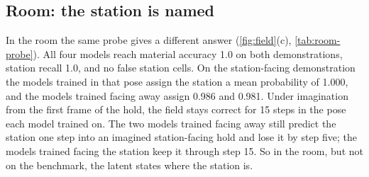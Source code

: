 \subsection{Room: the station is named}

In the room the same probe gives a different answer (\cref{fig:field}(c), \cref{tab:room-probe}).
All four models reach material accuracy 1.0 on both demonstrations, station recall 1.0, and no false station cells.
On the station-facing demonstration the models trained in that pose assign the station a mean probability of 1.000, and the models trained facing away assign 0.986 and 0.981.
Under imagination from the first frame of the hold, the field stays correct for 15 steps in the pose each model trained on.
The two models trained facing away still predict the station one step into an imagined station-facing hold and lose it by step five; the models trained facing the station keep it through step 15.
So in the room, but not on the benchmark, the latent states where the station is.
